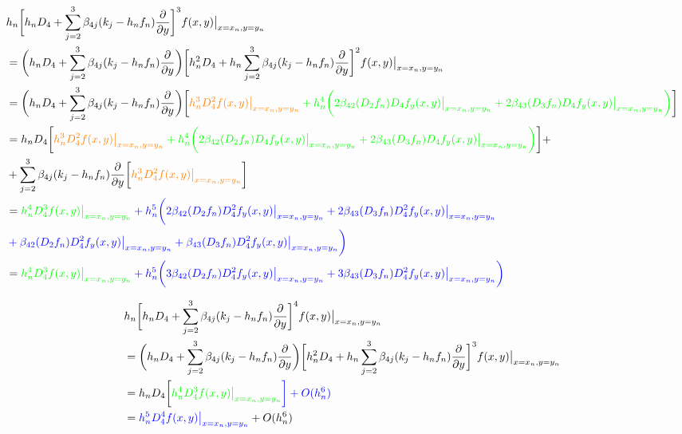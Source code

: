 \documentclass[12 pt]{article}
\begin{document}
\newpage
\begin{align*}
	&h_{n}\bigg[h_{n}D_{4} + \sum_{j=2}^{3}\beta_{4j}(k_{j} - h_{n}f_{n})\frac{\partial}{\partial y}\bigg]^{3}f(x,y)\big\vert_{x = x_{n}, y= y_{n}}\\
	&= \bigg(h_{n}D_{4} + \sum_{j=2}^{3}\beta_{4j}(k_{j} - h_{n}f_{n})\frac{\partial}{\partial y}\bigg)\bigg[h_{n}^{2}D_{4} + h_{n}\sum_{j=2}^{3}\beta_{4j}(k_{j} - h_{n}f_{n})\frac{\partial}{\partial y}\bigg]^{2}f(x,y)\big\vert_{x = x_{n}, y= y_{n}}\\
	&= \bigg(h_{n}D_{4} + \sum_{j=2}^{3}\beta_{4j}(k_{j} - h_{n}f_{n})\frac{\partial}{\partial y}\bigg)\bigg[\color{orange}h_{n}^{3}D_{4}^{2}f(x,y)\big\vert_{x = x_{n}, y= y_{n}} \color{green} + h_{n}^{4}\bigg(2\beta_{42}(D_{2}f_{n})D_{4}f_{y}(x,y)\big\vert_{x = x_{n}, y= y_{n}} + 2\beta_{43}(D_{3}f_{n})D_{4}f_{y}(x,y)\big\vert_{x = x_{n}, y= y_{n}}\bigg)\color{black}\bigg]\\
	&= h_{n}D_{4}\bigg[\color{orange}h_{n}^{3}D_{4}^{2}f(x,y)\big\vert_{x = x_{n}, y= y_{n}} \color{green} + h_{n}^{4}\bigg(2\beta_{42}(D_{2}f_{n})D_{4}f_{y}(x,y)\big\vert_{x = x_{n}, y= y_{n}} + 2\beta_{43}(D_{3}f_{n})D_{4}f_{y}(x,y)\big\vert_{x = x_{n}, y= y_{n}}\bigg)\color{black}\bigg] + \\
	&+ \sum_{j=2}^{3}\beta_{4j}(k_{j} - h_{n}f_{n})\frac{\partial}{\partial y}\bigg[\color{orange}h_{n}^{3}D_{4}^{2}f(x,y)\big\vert_{x = x_{n}, y= y_{n}}\color{black}\bigg]\\
	&= \color{green}h_{n}^{4}D_{4}^{3}f(x,y)\big\vert_{x = x_{n}, y= y_{n}} \color{blue}+ h_{n}^{5}\bigg(2\beta_{42}(D_{2}f_{n})D_{4}^{2}f_{y}(x,y)\big\vert_{x = x_{n}, y= y_{n}} + 2\beta_{43}(D_{3}f_{n})D_{4}^{2}f_{y}(x,y)\big\vert_{x = x_{n}, y= y_{n}}\\
	&\color{blue}+\beta_{42}(D_{2}f_{n})D_{4}^{2}f_{y}(x,y)\big\vert_{x = x_{n}, y= y_{n}} + \beta_{43}(D_{3}f_{n})D_{4}^{2}f_{y}(x,y)\big\vert_{x = x_{n}, y= y_{n}}\bigg)\\
	&= \color{green}h_{n}^{4}D_{4}^{3}f(x,y)\big\vert_{x = x_{n}, y= y_{n}} \color{blue}+h_{n}^{5}\bigg(3\beta_{42}(D_{2}f_{n})D_{4}^{2}f_{y}(x,y)\big\vert_{x = x_{n}, y= y_{n}} + 3\beta_{43}(D_{3}f_{n})D_{4}^{2}f_{y}(x,y)\big\vert_{x = x_{n}, y= y_{n}}\bigg)
\end{align*}

\begin{align*}
	&h_{n}\bigg[h_{n}D_{4} + \sum_{j=2}^{3}\beta_{4j}(k_{j} - h_{n}f_{n})\frac{\partial}{\partial y}\bigg]^{4}f(x,y)\big\vert_{x = x_{n}, y= y_{n}}\\
	&=  \bigg(h_{n}D_{4} + \sum_{j=2}^{3}\beta_{4j}(k_{j} - h_{n}f_{n})\frac{\partial}{\partial y}\bigg)\bigg[h_{n}^{2}D_{4} + h_{n}\sum_{j=2}^{3}\beta_{4j}(k_{j} - h_{n}f_{n})\frac{\partial}{\partial y}\bigg]^{3}f(x,y)\big\vert_{x = x_{n}, y= y_{n}}\\
	&= h_{n}D_{4}\bigg[\color{green}h_{n}^{4}D_{4}^{3}f(x,y)\big\vert_{x = x_{n}, y= y_{n}} \color{blue}\bigg] + O(h_{n}^{6})\\
	&= \color{blue}h_{n}^{5}D_{4}^{4}f(x,y)\big\vert_{x = x_{n}, y= y_{n}} \color{black}+ O(h_{n}^{6})
\end{align*}
\end{document}
